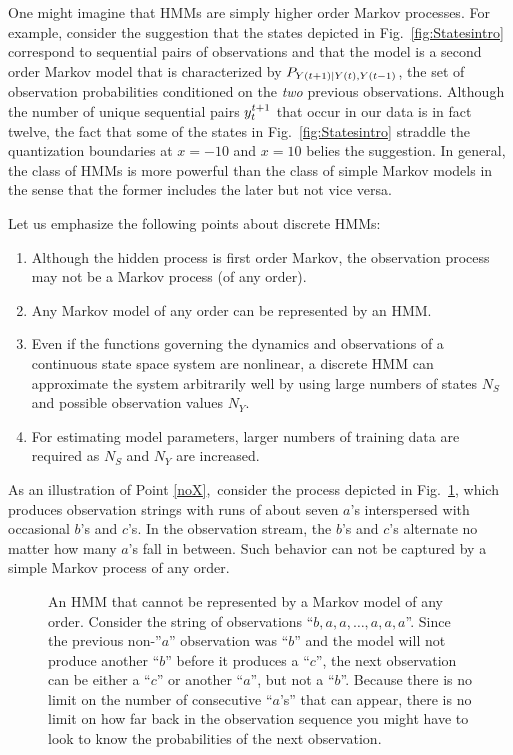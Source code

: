 One might imagine that HMMs are simply higher order Markov processes.
For example, consider the suggestion that the states depicted in
Fig.~\ref{fig:Statesintro} correspond to sequential pairs of
observations and that the model is a second order Markov model that is
characterized by $P_{{Y}{(t+1)}|{Y}{(t)},{Y}{(t-1)}}$, the set of
observation probabilities conditioned on the \emph{two} previous
observations.  Although the number of unique sequential pairs
$y_{t}^{t+1}$ that occur in our data is in fact twelve, the fact
that some of the states in Fig.~\ref{fig:Statesintro} straddle the
quantization boundaries at $x = -10$ and $x=10$ belies the suggestion.
In general, the class of HMMs is more powerful than the class of
simple Markov models in the sense that the former includes the later
but not vice versa.

Let us emphasize the following points about discrete HMMs:
\begin{enumerate}
\item Although the hidden process is first order Markov, the observation
process may not be a Markov process (of any order). \label{noX}
\item Any Markov model of any order can be represented by an HMM.
\item Even if the functions governing the dynamics and
  observations of a continuous state space system are nonlinear, a
  discrete HMM can approximate the system arbitrarily well by using
  large numbers of states $N_S$ and possible observation values $N_Y$.
\item For estimating model parameters, larger numbers of training data
  are required as $N_S$ and $N_Y$ are increased. \label{point:large}
\end{enumerate}

\longpage%
As an illustration of Point \ref{noX},\ consider the process depicted in
Fig.~\ref{fig:nonmm}, which produces observation strings with runs of about
seven $a$'s interspersed with occasional $b$'s and $c$'s.  In the
observation stream, the $b$'s and $c$'s alternate no matter how many $a$'s
fall in between.  Such behavior can not be captured by a simple Markov
process of any order.

\begin{figure}[htbp]
  \centering{\plotsize%
    }
  \caption[An HMM that cannot be represented by a Markov model.]%
  {An HMM that cannot be represented by a Markov model of any order.
    Consider the string of observations ``$b,a,a,\ldots,a,a,a$''.
    Since the previous non-''$a$'' observation was ``$b$'' and the
    model will not produce another ``$b$'' before it produces a
    ``$c$'', the next observation can be either a ``$c$'' or another
    ``$a$'', but not a ``$b$''.  Because there is no limit on the
    number of consecutive ``$a$'s'' that can appear, there is no limit
    on how far back in the observation sequence you might have to look
    to know the probabilities of the next observation.}
  \label{fig:nonmm}
\end{figure}

